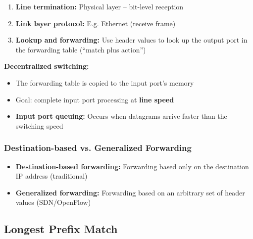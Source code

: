 \begin{keybox}
\begin{enumerate}[noitemsep]
    \item \textbf{Line termination:} Physical layer -- bit-level reception
    \item \textbf{Link layer protocol:} E.g. Ethernet (receive frame)
    \item \textbf{Lookup and forwarding:} Use header values to look up the output port in the forwarding table (``match plus action'')
\end{enumerate}

\medskip
\textbf{Decentralized switching:}
\begin{itemize}[noitemsep]
    \item The forwarding table is copied to the input port's memory
    \item Goal: complete input port processing at \textbf{line speed}
    \item \textbf{Input port queuing:} Occurs when datagrams arrive faster than the switching speed
\end{itemize}
\end{keybox}

\subsubsection{Destination-based vs. Generalized Forwarding}
\begin{itemize}[noitemsep]
    \item \textbf{Destination-based forwarding:} Forwarding based only on the destination IP address (traditional)
    \item \textbf{Generalized forwarding:} Forwarding based on an arbitrary set of header values (SDN/OpenFlow)
\end{itemize}

\subsection{Longest Prefix Match}

